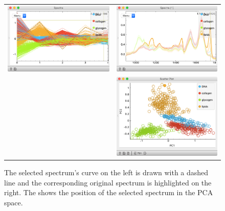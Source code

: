 \begin{figure}[h]
  \centering
  \begin{tabular}{ c  c }
      \includegraphics[scale=0.4]{selection-spectra.png}  & \includegraphics[scale=0.4]{subset-spectra.png} \\
      & \includegraphics[scale=0.4]{subset-scatterplot.png}
  \end{tabular}
  \vspace{0.3cm}
  \caption{The selected spectrum's curve on the left is drawn with a dashed line and the corresponding original spectrum is highlighted on the right. The  shows the position of the selected spectrum in the PCA space.}
\end{figure}
